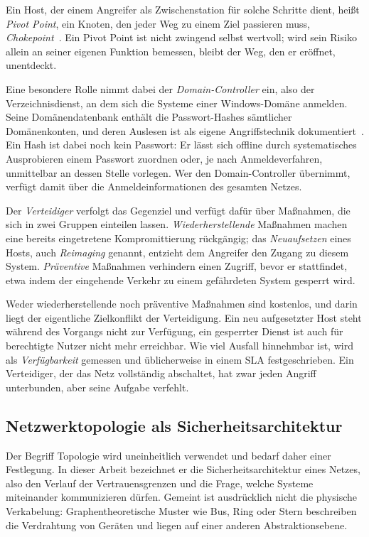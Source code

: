 Ein Host, der einem Angreifer als Zwischenstation für solche Schritte dient,
heißt \emph{Pivot Point}, ein Knoten, den jeder Weg zu einem Ziel passieren
muss, \emph{Chokepoint}~\cite[Abschn.~II.A]{gangupantulu2021cja}. Ein Pivot
Point ist nicht zwingend selbst wertvoll; wird sein Risiko allein an seiner
eigenen Funktion bemessen, bleibt der Weg, den er eröffnet, unentdeckt.

Eine besondere Rolle nimmt dabei der \emph{Domain-Controller} ein, also der
Verzeichnisdienst, an dem sich die Systeme einer Windows-Domäne anmelden. Seine
Domänendatenbank enthält die Passwort-Hashes sämtlicher Domänenkonten, und deren
Auslesen ist als eigene Angriffstechnik dokumentiert~\cite{mitreattack_ntds}.
Ein Hash ist dabei noch kein Passwort: Er lässt sich offline durch
systematisches Ausprobieren einem Passwort zuordnen oder, je nach
Anmeldeverfahren, unmittelbar an dessen Stelle vorlegen. Wer den
Domain-Controller übernimmt, verfügt damit über die Anmeldeinformationen des
gesamten Netzes.

Der \emph{Verteidiger} verfolgt das Gegenziel und verfügt dafür über Maßnahmen,
die sich in zwei Gruppen einteilen lassen. \emph{Wiederherstellende} Maßnahmen
machen eine bereits eingetretene Kompromittierung rückgängig; das
\emph{Neuaufsetzen} eines Hosts, auch \emph{Reimaging} genannt, entzieht dem
Angreifer den Zugang zu diesem System. \emph{Präventive} Maßnahmen verhindern
einen Zugriff, bevor er stattfindet, etwa indem der eingehende Verkehr zu einem
gefährdeten System gesperrt wird.

Weder wiederherstellende noch präventive Maßnahmen sind kostenlos, und darin
liegt der eigentliche Zielkonflikt der Verteidigung. Ein neu aufgesetzter Host steht während des Vorgangs nicht zur
Verfügung, ein gesperrter Dienst ist auch für berechtigte Nutzer nicht mehr
erreichbar. Wie viel Ausfall hinnehmbar ist, wird als \emph{Verfügbarkeit}
gemessen und üblicherweise in einem \ac{SLA} festgeschrieben. Ein Verteidiger,
der das Netz vollständig abschaltet, hat zwar jeden Angriff unterbunden, aber
seine Aufgabe verfehlt.

\subsection{Netzwerktopologie als Sicherheitsarchitektur}
\label{sec:topologien}

Der Begriff Topologie wird uneinheitlich verwendet und bedarf daher einer
Festlegung. In dieser Arbeit bezeichnet er die Sicherheitsarchitektur eines
Netzes, also den Verlauf der Vertrauensgrenzen und die Frage, welche Systeme
miteinander kommunizieren dürfen. Gemeint ist ausdrücklich nicht die physische
Verkabelung: Graphentheoretische Muster wie Bus, Ring oder Stern beschreiben die
Verdrahtung von Geräten und liegen auf einer anderen Abstraktionsebene.


